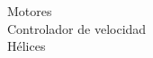 
\begin{description}

\item[Motores]

\item[Controlador de velocidad]

\item[Hélices]

\end{description}
	
